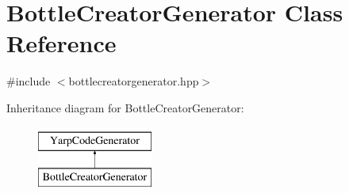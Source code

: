\hypertarget{classBottleCreatorGenerator}{\section{Bottle\-Creator\-Generator Class Reference}
\label{classBottleCreatorGenerator}
}


{\ttfamily \#include $<$bottlecreatorgenerator.\-hpp$>$}

Inheritance diagram for Bottle\-Creator\-Generator\-:\begin{figure}[H]
\begin{center}
\leavevmode
\includegraphics[height=2.000000cm]{classBottleCreatorGenerator}
\end{center}
\end{figure}
